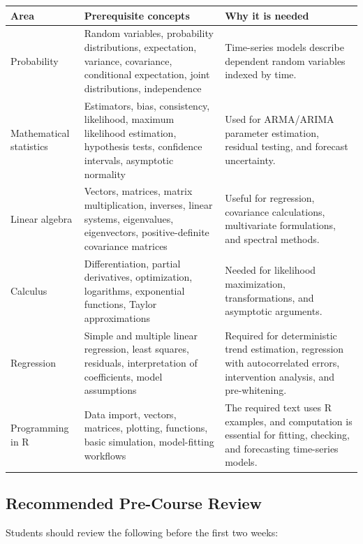 \documentclass[11pt]{article}
\begin{document}
\begin{longtable}{p{} p{} p{}}
\toprule
\textbf{Area} & \textbf{Prerequisite concepts} & \textbf{Why it is needed} \\
\midrule
\endhead

Probability &
Random variables, probability distributions, expectation, variance, covariance,
conditional expectation, joint distributions, independence &
Time-series models describe dependent random variables indexed by time. \\

Mathematical statistics &
Estimators, bias, consistency, likelihood, maximum likelihood estimation,
hypothesis tests, confidence intervals, asymptotic normality &
Used for ARMA/ARIMA parameter estimation, residual testing, and forecast
uncertainty. \\

Linear algebra &
Vectors, matrices, matrix multiplication, inverses, linear systems,
eigenvalues, eigenvectors, positive-definite covariance matrices &
Useful for regression, covariance calculations, multivariate formulations,
and spectral methods. \\

Calculus &
Differentiation, partial derivatives, optimization, logarithms, exponential
functions, Taylor approximations &
Needed for likelihood maximization, transformations, and asymptotic arguments. \\

Regression &
Simple and multiple linear regression, least squares, residuals, interpretation
of coefficients, model assumptions &
Required for deterministic trend estimation, regression with autocorrelated
errors, intervention analysis, and pre-whitening. \\

Programming in R &
Data import, vectors, matrices, plotting, functions, basic simulation,
model-fitting workflows &
The required text uses R examples, and computation is essential for fitting,
checking, and forecasting time-series models. \\

\bottomrule
\end{longtable}

\subsection{Recommended Pre-Course Review}

Students should review the following before the first two weeks:
\end{document}
